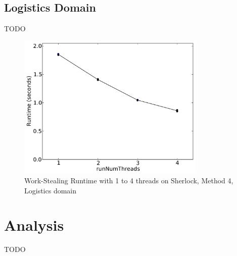 \documentclass[12pt,twoside,abbrevs,msc,ai,notimes,logo,sansheadings]{infthesis}
\begin{document}
  \subsection{Logistics Domain}
  TODO
  
  \begin{figure}[!htbp]
  \begin{centering}
  \includegraphics[width=0.8\textwidth]{images/threads-log3-sherlock-4-1}
  \par\end{centering}
  \caption{Work-Stealing Runtime with 1 to 4 threads on Sherlock, Method 4, Logistics domain}
  \end{figure}
  
  \section{Analysis}
  TODO
  
   
  
  
  
  

  \appendix


  {}
  
\end{document}
